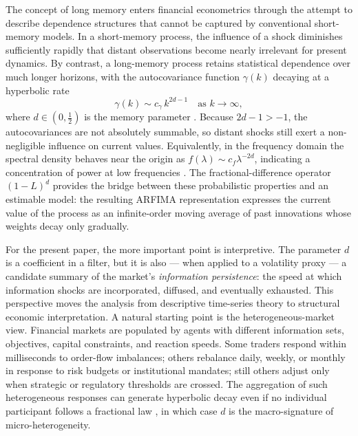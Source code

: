 \documentclass[11pt,a4paper]{article}
\begin{document}
The concept of long memory enters financial econometrics through the
attempt to describe dependence structures that cannot be captured by
conventional short-memory models. In a short-memory process, the influence
of a shock diminishes sufficiently rapidly that distant observations become
nearly irrelevant for present dynamics. By contrast, a long-memory process
retains statistical dependence over much longer horizons, with the
autocovariance function $\gamma(k)$ decaying at a hyperbolic rate
\begin{equation}
  \gamma(k) \sim c_\gamma\, k^{2d-1}\quad \text{as } k\to\infty,
  \label{eq:lm-autocov}
\end{equation}
where $d\in(0, \tfrac12)$ is the memory parameter
\citep{granger1980introduction,hosking1981fractional}. Because $2d-1>-1$,
the autocovariances are not absolutely summable, so distant shocks still
exert a non-negligible influence on current values. Equivalently, in the
frequency domain the spectral density behaves near the origin as
$f(\lambda)\sim c_f \lambda^{-2d}$, indicating a concentration of power at
low frequencies \citep{robinson1995gaussian}. The fractional-difference
operator $(1-L)^d$ provides the bridge between these probabilistic
properties and an estimable model: the resulting ARFIMA representation
expresses the current value of the process as an infinite-order moving
average of past innovations whose weights decay only gradually.

For the present paper, the more important point is interpretive. The
parameter $d$ is a coefficient in a filter, but it is also --- when
applied to a volatility proxy --- a candidate summary of the market's
\emph{information persistence}: the speed at which information shocks are
incorporated, diffused, and eventually exhausted. This perspective moves
the analysis from descriptive time-series theory to structural economic
interpretation. A natural starting point is the heterogeneous-market view.
Financial markets are populated by agents with different information sets,
objectives, capital constraints, and reaction speeds. Some traders respond
within milliseconds to order-flow imbalances; others rebalance daily,
weekly, or monthly in response to risk budgets or institutional mandates;
still others adjust only when strategic or regulatory thresholds are
crossed. The aggregation of such heterogeneous responses can generate
hyperbolic decay even if no individual participant follows a fractional
law \citep{muller1997volatilities,corsi2009simple}, in which case $d$ is
the macro-signature of micro-heterogeneity.
\end{document}
